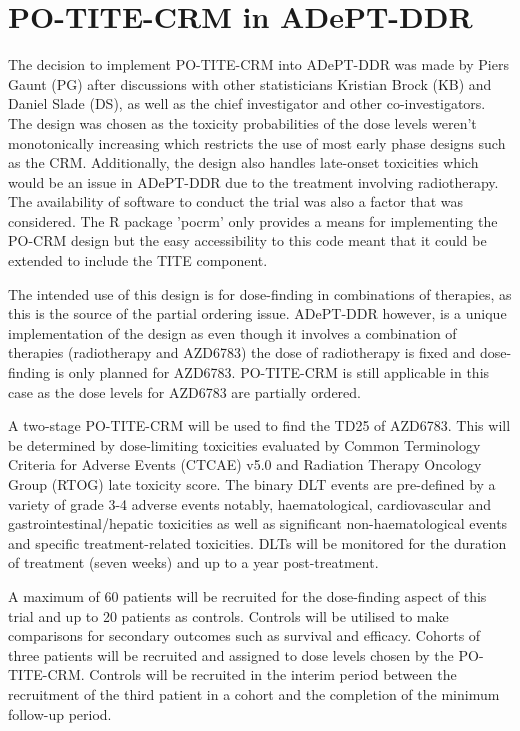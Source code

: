 
\section{PO-TITE-CRM in ADePT-DDR}  
\label{section2.3}%
The decision to implement PO-TITE-CRM into ADePT-DDR was made by Piers Gaunt (PG) after discussions with other statisticians Kristian Brock (KB) and Daniel Slade (DS), as well as the chief investigator and other co-investigators. The design was chosen as the toxicity probabilities of the dose levels weren't monotonically increasing which restricts the use of most early phase designs such as the CRM. Additionally, the design also handles late-onset toxicities which would be an issue in ADePT-DDR due to the treatment involving radiotherapy. The availability of software to conduct the trial was also a factor that was considered. The R package 'pocrm' \cite{wagesPocrmRpackagePhase2013} only provides a means for implementing the PO-CRM design but the easy accessibility to this code meant that it could be extended to include the TITE component.  

The intended use of this design is for dose-finding in combinations of therapies, as this is the source of the partial ordering issue. ADePT-DDR however, is a unique implementation of the design as even though it involves a combination of therapies (radiotherapy and AZD6783) the dose of radiotherapy is fixed and dose-finding is only planned for AZD6783. PO-TITE-CRM is still applicable in this case as the dose levels for AZD6783 are partially ordered. 

A two-stage PO-TITE-CRM will be used to find the TD25 of AZD6783. This will be determined by dose-limiting toxicities evaluated by Common Terminology Criteria for Adverse Events (CTCAE) v5.0 and Radiation Therapy Oncology Group (RTOG) late toxicity score. The binary DLT events are pre-defined by a variety of grade 3-4 adverse events notably, haematological, cardiovascular and gastrointestinal/hepatic toxicities as well as significant non-haematological events and specific treatment-related toxicities. DLTs will be monitored for the duration of treatment (seven weeks) and up to a year post-treatment. 


A maximum of 60 patients will be recruited for the dose-finding aspect of this trial and up to 20 patients as controls. Controls will be utilised to make comparisons for secondary outcomes such as survival and efficacy. Cohorts of three patients will be recruited and assigned to dose levels chosen by the PO-TITE-CRM. Controls will be recruited in the interim period between the recruitment of the third patient in a cohort and the completion of the minimum follow-up period.    

